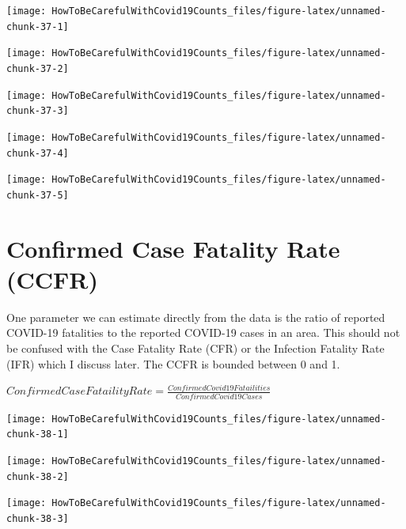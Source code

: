 \documentclass[
]{book}
\begin{document}
\begin{center}\texttt{[image: HowToBeCarefulWithCovid19Counts\_files/figure-latex/unnamed-chunk-37-1]} \end{center}

\begin{center}\texttt{[image: HowToBeCarefulWithCovid19Counts\_files/figure-latex/unnamed-chunk-37-2]} \end{center}

\begin{center}\texttt{[image: HowToBeCarefulWithCovid19Counts\_files/figure-latex/unnamed-chunk-37-3]} \end{center}

\begin{center}\texttt{[image: HowToBeCarefulWithCovid19Counts\_files/figure-latex/unnamed-chunk-37-4]} \end{center}

\begin{center}\texttt{[image: HowToBeCarefulWithCovid19Counts\_files/figure-latex/unnamed-chunk-37-5]} \end{center}

\hypertarget{confirmed-case-fatality-rate-ccfr}{%
\section{Confirmed Case Fatality Rate (CCFR)}\label{confirmed-case-fatality-rate-ccfr}}

One parameter we can estimate directly from the data is the ratio of reported COVID-19 fatalities to the reported COVID-19 cases in an area. This should not be confused with the Case Fatality Rate (CFR) or the Infection Fatality Rate (IFR) which I discuss later. The CCFR is bounded between 0 and 1.

\(Confirmed Case Fataility Rate = \frac{ConfirmedCovid19Fatailities}{ConfirmedCovid19Cases}\)

\begin{center}\texttt{[image: HowToBeCarefulWithCovid19Counts\_files/figure-latex/unnamed-chunk-38-1]} \end{center}

\begin{center}\texttt{[image: HowToBeCarefulWithCovid19Counts\_files/figure-latex/unnamed-chunk-38-2]} \end{center}

\begin{center}\texttt{[image: HowToBeCarefulWithCovid19Counts\_files/figure-latex/unnamed-chunk-38-3]} \end{center}
\end{document}

